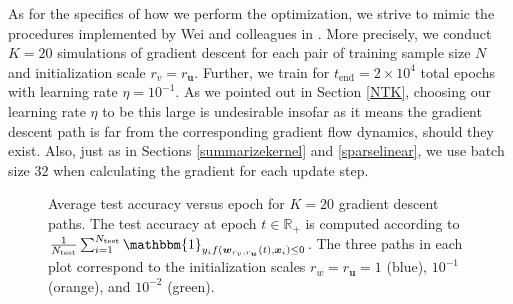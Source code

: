 \documentclass{article}
\begin{document}
As for the specifics of how we perform the optimization, we strive to mimic the procedures implemented by Wei and colleagues in \cite{wei2019regularization}. More precisely, we conduct $K=20$ simulations of gradient descent for each pair of training sample size $N$ and initialization scale $r_v = r_{\boldsymbol{u}}$. Further, we train for $t_{\text{end}} = 2\times 10^4$ total epochs with learning rate $\eta = 10^{-1}$. As we pointed out in Section \ref{NTK}, choosing our learning rate $\eta$ to be this large is undesirable insofar as it means the gradient descent path is far from the corresponding gradient flow dynamics, should they exist. Also, just as in Sections \ref{summarizekernel} and \ref{sparselinear}, we use batch size $32$ when calculating the gradient for each update step.

\begin{figure}[H]
\centering
{}\hfill
{}\par 
{}
\caption{Average test accuracy versus epoch for $K=20$ gradient descent paths. The test accuracy at epoch $t \in \mathbb{R}_+$ is computed according to $\frac{1}{N_{\text{test}}} \sum_{i=1}^{N_{\text{test}}} \mathbbm{1}_{y_i f(\boldsymbol{w}_{r_v, r_{\boldsymbol{u}}}(t), \boldsymbol{x}_i) \leq 0}$. The three paths in each plot correspond to the initialization scales $r_w = r_{\boldsymbol{u}} = 1$ (blue), $10^{-1}$ (orange), and $10^{-2}$ (green).}\label{fig:testerrlogistic}
\end{figure}
\end{document}
